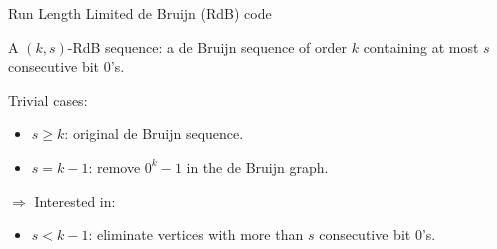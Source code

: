 \begin{frame}{Run Length Limited de Bruijn (RdB) code}
    \begin{definition}
        A $(k,s)$-RdB sequence: a de Bruijn sequence of order $k$ containing at most $s$ consecutive bit $0$'s.
    \end{definition}
    \begin{overprint}
            Trivial cases:
            \begin{itemize}
                \item $s\geq k$: original de Bruijn sequence.
                \item $s=k-1$: remove $0^k-1$ in the de Bruijn graph.
            \end{itemize}
            $\Rightarrow$ Interested in:
            \begin{itemize}
                \item $s<k-1$: eliminate vertices with more than $s$ consecutive bit $0$'s.
            \end{itemize}
            \begin{columns}
\end{columns}
\end{overprint}
\end{frame}
